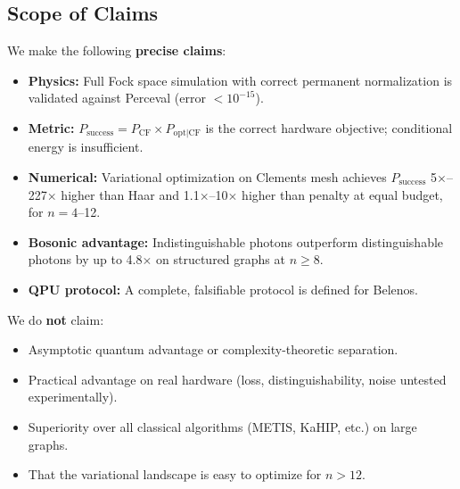 \subsection{Scope of Claims}

We make the following \textbf{precise claims}:
\begin{itemize}
\item \textbf{Physics:} Full Fock space simulation with correct permanent normalization is validated against Perceval (error $< 10^{-15}$).
\item \textbf{Metric:} $P_{\mathrm{success}} = P_{\mathrm{CF}} \times P_{\mathrm{opt|CF}}$ is the correct hardware objective; conditional energy is insufficient.
\item \textbf{Numerical:} Variational optimization on Clements mesh achieves $P_{\mathrm{success}}$ 5$\times$--227$\times$ higher than Haar and 1.1$\times$--10$\times$ higher than penalty at equal budget, for $n=4$--12.
\item \textbf{Bosonic advantage:} Indistinguishable photons outperform distinguishable photons by up to 4.8$\times$ on structured graphs at $n\ge 8$.
\item \textbf{QPU protocol:} A complete, falsifiable protocol is defined for Belenos.
\end{itemize}

We do \textbf{not} claim:
\begin{itemize}
\item Asymptotic quantum advantage or complexity-theoretic separation.
\item Practical advantage on real hardware (loss, distinguishability, noise untested experimentally).
\item Superiority over all classical algorithms (METIS, KaHIP, etc.) on large graphs.
\item That the variational landscape is easy to optimize for $n > 12$.
\end{itemize}
